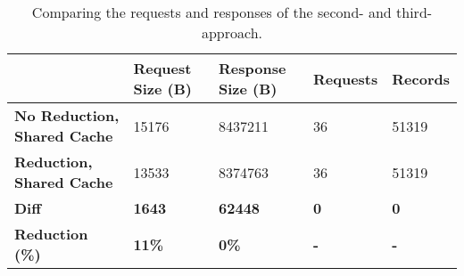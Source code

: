 \ifshowTables
\begin{table}[H]
  \begin{tabular}{|l|l|l|l|l|}
  \hline
  & \textbf{Request Size (B)} & \textbf{Response Size (B)} & \textbf{Requests} & \textbf{Records} \\
  \hline
  \textbf{No Reduction, Shared Cache} & 15176 &  8437211 & 36 & 51319 \\
  \hline
  \textbf{Reduction, Shared Cache} &  13533 &  8374763 & 36 & 51319 \\
  \hline
  \hline
  \textbf{Diff} & \textbf{1643} & \textbf{62448} & \textbf{0} & \textbf{0} \\
  \hline
  \textbf{Reduction (\%)} & \textbf{11\%} & \textbf{0\%} & \textbf{-} & \textbf{-} \\
  \hline
  \end{tabular}
  \caption{Comparing the requests and responses of the second- and third-approach.}\label{table:results:size-comparison-first-path-cache-no-reduction-cache-reduction}
\end{table}
\fi